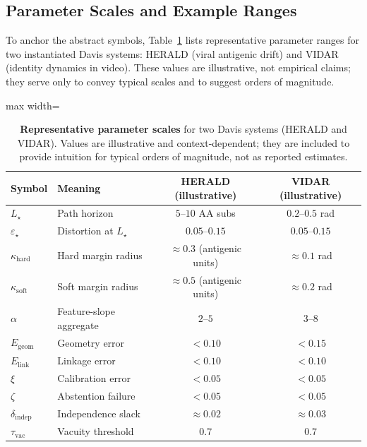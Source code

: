 \documentclass[11pt]{article}
\theoremstyle{remark}
\theoremstyle{plain}
\begin{document}
\subsection{Parameter Scales and Example Ranges}
\label{subsec:param-table}

To anchor the abstract symbols, Table~\ref{tab:params} lists representative parameter
ranges for two instantiated Davis systems: HERALD (viral antigenic drift) and VIDAR
(identity dynamics in video). These values are illustrative, not empirical claims; they
serve only to convey typical scales and to suggest orders of magnitude.

\begin{table}[t]
    \centering
    \begin{adjustbox}{max width=\linewidth}
    \begin{tabular}{llcc}
        \toprule
        Symbol & Meaning & HERALD (illustrative) & VIDAR (illustrative) \\
        \midrule
        $L_\star$ & Path horizon & $5$--$10$ AA subs & $0.2$--$0.5$ rad \\
        $\varepsilon_\star$ & Distortion at $L_\star$ & $0.05$--$0.15$ & $0.05$--$0.15$ \\
        $\kappa_{\mathrm{hard}}$ & Hard margin radius & $\approx 0.3$ (antigenic units) & $\approx 0.1$ rad \\
        $\kappa_{\mathrm{soft}}$ & Soft margin radius & $\approx 0.5$ (antigenic units) & $\approx 0.2$ rad \\
        $\alpha$ & Feature-slope aggregate & $2$--$5$ & $3$--$8$ \\
        $E_{\text{geom}}$ & Geometry error & $< 0.10$ & $< 0.15$ \\
        $E_{\text{link}}$ & Linkage error & $< 0.10$ & $< 0.10$ \\
        $\xi$ & Calibration error & $< 0.05$ & $< 0.05$ \\
        $\zeta$ & Abstention failure & $< 0.05$ & $< 0.05$ \\
        $\delta_{\text{indep}}$ & Independence slack & $\approx 0.02$ & $\approx 0.03$ \\
        $\tau_{\text{vac}}$ & Vacuity threshold & $0.7$ & $0.7$ \\
        \bottomrule
    \end{tabular}
    \end{adjustbox}
    \caption{\textbf{Representative parameter scales} for two Davis systems (HERALD and VIDAR).
    Values are illustrative and context-dependent; they are included to provide intuition for
    typical orders of magnitude, not as reported estimates.}
    \label{tab:params}
\end{table}
\end{document}
